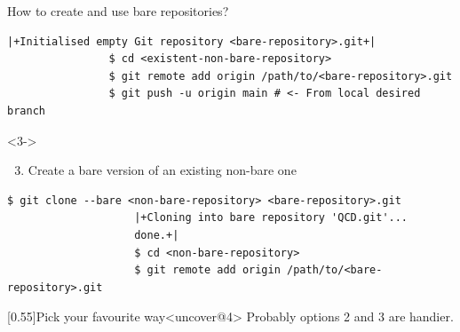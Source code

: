 \documentclass[usenames,svgnames,14pt]{beamer}
\begin{document}
\begin{frame}[fragile]{How to create and use bare repositories?}
\begin{overlayarea}{\textwidth}{0.8\textheight}
\begin{onlyenv}
\begin{lstlisting}[style=MyBash]
                |+Initialised empty Git repository <bare-repository>.git+|
                $ cd <existent-non-bare-repository>
                $ git remote add origin /path/to/<bare-repository>.git
                $ git push -u origin main # <- From local desired branch
            \end{lstlisting}
            \vspace{1mm}
            \begin{uncoverenv}<3->
                \begin{enumerate}
                    \setcounter{enumi}{2}
                    \item Create a bare version of an existing non-bare one
                \end{enumerate}
                \begin{lstlisting}[style=MyBash]
                    $ git clone --bare <non-bare-repository> <bare-repository>.git
                    |+Cloning into bare repository 'QCD.git'...
                    done.+|
                    $ cd <non-bare-repository>
                    $ git remote add origin /path/to/<bare-repository>.git
                \end{lstlisting}
            \end{uncoverenv}
            \vspace{-1mm}
            \begin{varblock}{}[0.55\textwidth]{Pick your favourite way}<uncover@4>
                \small Probably options 2 and 3 are handier.
            \end{varblock}
        \end{onlyenv}
    \end{overlayarea}
\end{frame}


\end{document}
